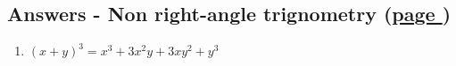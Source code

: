 \documentclass[../main.tex]{subfiles}
\begin{document}
\hypertarget{nonrighttriganswers}{\subsection*{Answers - Non right-angle trignometry (\hyperlink{nonrighttriglink}{page \pageref{Non right trig}})}}

\label{Non right trig answers}
\begin{enumerate}
    \item \( (x+y)^3 = x^3 + 3x^2 y + 3xy^2 +y^3 \)
    
\end{enumerate}
\end{document}
